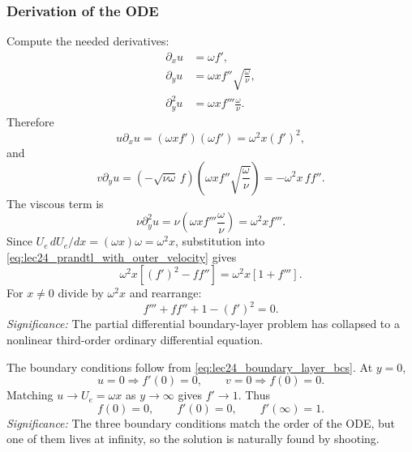 \documentclass[../main.tex]{subfiles}
\begin{document}
\subsubsection*{Derivation of the ODE}
Compute the needed derivatives:
\begin{equation}
  \begin{aligned}
  \partial_xu&=\omega f',\\
  \partial_yu&=\omega x f''\sqrt{\frac{\omega}{\nu}},\\
  \partial_y^2u&=\omega x f'''\frac{\omega}{\nu}.
  \end{aligned}
  \label{eq:lec24_similarity_derivatives}
\end{equation}
Therefore
\begin{equation}
  u\partial_xu
  =(\omega x f')(\omega f')
  =\omega^2x(f')^2,
  \label{eq:lec24_similarity_first_advection}
\end{equation}
and
\begin{equation}
  v\partial_yu
  =\left(-\sqrt{\nu\omega}\,f\right)
   \left(\omega x f''\sqrt{\frac{\omega}{\nu}}\right)
  =-\omega^2x\,f f''.
  \label{eq:lec24_similarity_second_advection}
\end{equation}
The viscous term is
\begin{equation}
  \nu\partial_y^2u=\nu\left(\omega x f'''\frac{\omega}{\nu}\right)
  =\omega^2x f'''.
  \label{eq:lec24_similarity_viscous}
\end{equation}
Since $U_e\,dU_e/dx=(\omega x)\omega=\omega^2x$, substitution into
\eqref{eq:lec24_prandtl_with_outer_velocity} gives
\begin{equation}
  \omega^2x\left[(f')^2-f f''\right]
  =\omega^2x\left[1+f'''\right].
  \label{eq:lec24_similarity_before_dividing}
\end{equation}
For $x\neq0$ divide by $\omega^2x$ and rearrange:
\begin{equation}
  \boxed{f'''+f f''+1-(f')^2=0.}
  \label{eq:lec24_hiemenz_equation}
\end{equation}
\textit{Significance:} The partial differential boundary-layer problem has
collapsed to a nonlinear third-order ordinary differential equation.

The boundary conditions follow from \eqref{eq:lec24_boundary_layer_bcs}.  At
$y=0$,
\[
  u=0\Rightarrow f'(0)=0,\qquad
  v=0\Rightarrow f(0)=0.
\]
Matching $u\to U_e=\omega x$ as $y\to\infty$ gives $f'\to1$.  Thus
\begin{equation}
  \boxed{f(0)=0,\qquad f'(0)=0,\qquad f'(\infty)=1.}
  \label{eq:lec24_hiemenz_bcs}
\end{equation}
\textit{Significance:} The three boundary conditions match the order of the
ODE, but one of them lives at infinity, so the solution is naturally found by
shooting.
\end{document}
